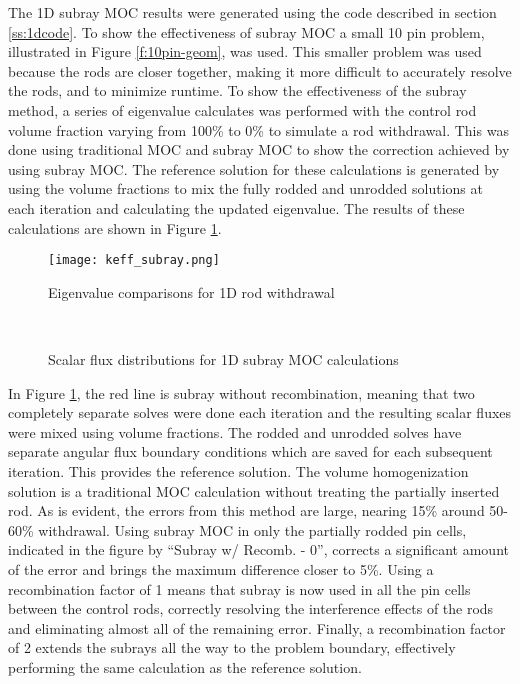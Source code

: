 The 1D subray MOC results were generated using the code described in section \ref{ss:1dcode}.  To show the effectiveness of subray MOC a small 10 pin problem, illustrated in Figure \ref{f:10pin-geom}, was used.  This smaller problem was used because the rods are closer together, making it more difficult to accurately resolve the rods, and to minimize runtime.  To show the effectiveness of the subray method, a series of eigenvalue calculates was performed with the control rod volume fraction varying from 100\% to 0\% to simulate a rod withdrawal.  This was done using traditional MOC and subray MOC to show the correction achieved by using subray MOC.  The reference solution for these calculations is generated by using the volume fractions to mix the fully rodded and unrodded solutions at each iteration and calculating the updated eigenvalue.  The results of these calculations are shown in Figure \ref{f:1d-subray-keff}.

\begin{figure}[h]
    \centering
    \texttt{[image: keff\_subray.png]}
    \caption{Eigenvalue comparisons for 1D rod withdrawal}\label{f:1d-subray-keff}
\end{figure}

\begin{figure}[!htb]
    \centering
    ~
    \caption{Scalar flux distributions for 1D subray MOC calculations}\label{f:1d-subray-scalflux}
\end{figure}

In Figure \ref{f:1d-subray-keff}, the red line is subray without recombination, meaning that two completely separate solves were done each iteration and the resulting scalar fluxes were mixed using volume fractions.  The rodded and unrodded solves have separate angular flux boundary conditions which are saved for each subsequent iteration.  This provides the reference solution.  The volume homogenization solution is a traditional MOC calculation without treating the partially inserted rod.  As is evident, the errors from this method are large, nearing 15\% around 50-60\% withdrawal.  Using subray MOC in only the partially rodded pin cells, indicated in the figure by ``Subray w/ Recomb. - 0'', corrects a significant amount of the error and brings the maximum difference closer to 5\%.  Using a recombination factor of 1 means that subray is now used in all the pin cells between the control rods, correctly resolving the interference effects of the rods and eliminating almost all of the remaining error.  Finally, a recombination factor of 2 extends the subrays all the way to the problem boundary, effectively performing the same calculation as the reference solution.

